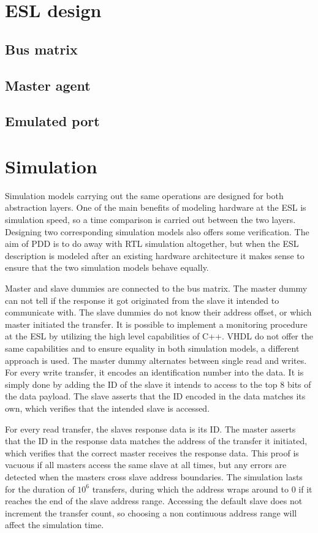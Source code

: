 \section{ESL design}

\subsection{Bus matrix}

\subsection{Master agent}

\subsection{Emulated port}





\section{Simulation}
\label{sec:sim}
Simulation models carrying out the same operations are designed for both abstraction layers. One of the main benefits of modeling hardware at the ESL is simulation speed, so a time comparison is carried out between the two layers. Designing two corresponding simulation models also offers some verification. 
The aim of PDD is to do away with RTL simulation altogether, but when the ESL description is modeled after an existing hardware architecture it makes sense
to ensure that the two simulation models behave equally. \par
Master and slave dummies are connected to the bus matrix. The master dummy can not tell if the response it got originated from the slave it intended to communicate with. The slave dummies do not know their address offset, or which master initiated the transfer. It is possible to implement a monitoring procedure at the ESL by utilizing the high level capabilities of C++. VHDL do not offer the same capabilities and to ensure equality in both simulation models, a different approach is used. The master dummy alternates between single read and writes. For every write transfer, it encodes an identification number into the data. It is simply done by adding the ID of the slave it intends to access to the top 8 bits of the data payload. The slave asserts that the ID encoded in the data matches its own, which verifies that the intended slave is accessed. \par
For every read transfer, the slaves response data is its ID. The master asserts that the ID in the response data matches the address of the transfer it initiated, which verifies that the correct master receives the response data. This proof is vacuous if all masters access the same slave at all times, but any errors are detected when the masters cross slave address boundaries. The simulation lasts for the duration of $10^6$ transfers, during which the address wraps around to 0 if it reaches the end of the slave address range. Accessing the default slave does not increment the transfer count, so choosing a non continuous address range will affect the simulation time.
  


